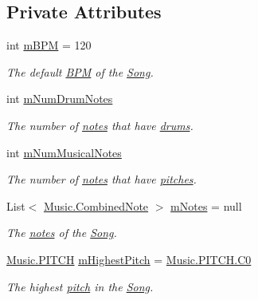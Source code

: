 \subsection*{Private Attributes}
\begin{DoxyCompactItemize}
\item 
int \hyperlink{group___song_priv_var_ga3341fbbd9c0c58fe6514623e6b6c5a1e}{m\+B\+PM} = 120
\begin{DoxyCompactList}\small\item\em The default \hyperlink{group___audio_DefBPM}{B\+PM} of the \hyperlink{class_song}{Song}. \end{DoxyCompactList}\item 
int \hyperlink{group___song_priv_var_ga3dbce17d96b434d4492280c39cff1778}{m\+Num\+Drum\+Notes}
\begin{DoxyCompactList}\small\item\em The number of \hyperlink{group___music_structs_struct_music_1_1_combined_note}{notes} that have \hyperlink{group___music_structs_struct_music_1_1_percussion_note}{drums}. \end{DoxyCompactList}\item 
int \hyperlink{group___song_priv_var_gaf55b4fd2df0457ba1306a75ac3fdc8b1}{m\+Num\+Musical\+Notes}
\begin{DoxyCompactList}\small\item\em The number of \hyperlink{group___music_structs_struct_music_1_1_combined_note}{notes} that have \hyperlink{group___music_structs_struct_music_1_1_melody_note}{pitches}. \end{DoxyCompactList}\item 
List$<$ \hyperlink{group___music_structs_struct_music_1_1_combined_note}{Music.\+Combined\+Note} $>$ \hyperlink{group___song_priv_var_ga674bc904a1f856d485d5fb7fe84bac85}{m\+Notes} = null
\begin{DoxyCompactList}\small\item\em The \hyperlink{group___music_structs_struct_music_1_1_combined_note}{notes} of the \hyperlink{class_song}{Song}. \end{DoxyCompactList}\item 
\hyperlink{group___music_enums_ga508f69b199ea518f935486c990edac1d}{Music.\+P\+I\+T\+CH} \hyperlink{group___song_priv_var_ga2dcd39d9add609e9df56a94057441dcc}{m\+Highest\+Pitch} = \hyperlink{group___music_enums_gga508f69b199ea518f935486c990edac1da9c5959e6f08f10d0edbadf5be1f33c53}{Music.\+P\+I\+T\+C\+H.\+C0}
\begin{DoxyCompactList}\small\item\em The highest \hyperlink{group___music_enums_ga508f69b199ea518f935486c990edac1d}{pitch} in the \hyperlink{class_song}{Song}. \end{DoxyCompactList}\item 

\end{DoxyCompactItemize}
